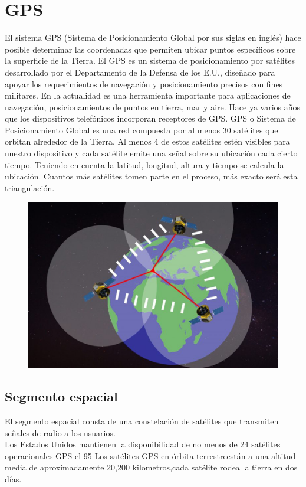 \section{GPS}
El sistema GPS (Sistema de Posicionamiento Global por sus siglas en inglés) hace posible determinar las coordenadas que permiten ubicar puntos específicos sobre la superficie de la Tierra. 
El GPS es un sistema de posicionamiento por satélites desarrollado por el Departamento de la Defensa de los E.U., diseñado para apoyar los requerimientos de navegación y posicionamiento precisos con fines militares. En la actualidad es una herramienta importante para aplicaciones de navegación, posicionamientos de puntos en tierra, mar y aire.
Hace ya varios años que los dispositivos telefónicos incorporan receptores de GPS. GPS o Sistema de Posicionamiento Global es una red compuesta por al menos 30 satélites que orbitan alrededor de la Tierra.
Al menos 4 de estos satélites estén visibles para nuestro dispositivo y cada satélite emite una señal sobre su ubicación cada cierto tiempo. Teniendo en cuenta la latitud, longitud, altura y tiempo se calcula la ubicación. Cuantos más satélites tomen parte en el proceso, más exacto será esta triangulación.
\begin{figure}[htbp]
	\begin{center}
		\includegraphics[width=.4\textwidth]{images/imgmarco/gps}
		\label{fig:gps}
	\end{center}
\end{figure}

\subsection{Segmento espacial}
El segmento espacial consta de una constelación de satélites que transmiten señales de radio a los usuarios.\\Los Estados Unidos mantienen la disponibilidad de no menos de 24 satélites operacionales GPS el 95%
Los satélites GPS en órbita terrestreestán a una altitud media de aproximadamente 20,200 kilometros,cada satélite rodea la tierra en dos días. 
